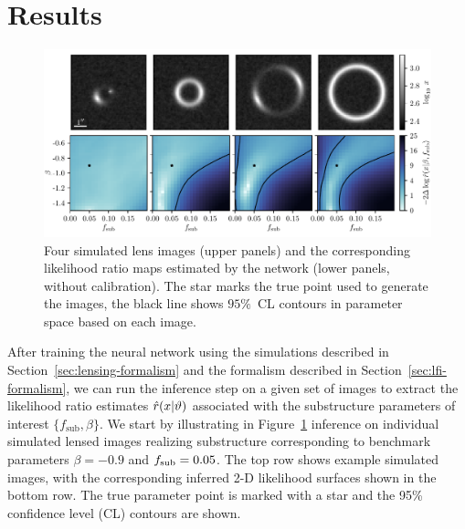 \documentclass[twocolumn]{aastex63}
\begin{document}
\section{Results}
\label{sec:results}

\begin{figure}
\centering
\includegraphics[width=1.\textwidth]{figures/individual_lens_predictions}
\caption{Four simulated lens images (upper panels) and the corresponding likelihood ratio maps estimated by the network (lower panels, without calibration). The star marks the true point used to generate the images, the black line shows $95 \%$~CL contours in parameter space based on each image.  }
\label{fig:individual_predictions}
\end{figure}

After training the neural network using the simulations described in Section~\ref{sec:lensing-formalism} and the formalism described in Section~\ref{sec:lfi-formalism}, we can run the inference step on a given set of images to extract the likelihood ratio estimates $\hat r(x | \vartheta)$ associated with the substructure parameters of interest $\{f_\mathrm{sub}, \beta\}$. We start by illustrating in Figure~\ref{fig:individual_predictions} inference on individual simulated lensed images realizing substructure corresponding to benchmark parameters $\beta = -0.9$ and $f_{\mathrm{sub}} = 0.05$. The top row shows example simulated images, with the corresponding inferred 2-D likelihood surfaces shown in the bottom row. The true parameter point is marked with a star and the 95\% confidence level (CL) contours are shown.
\end{document}
